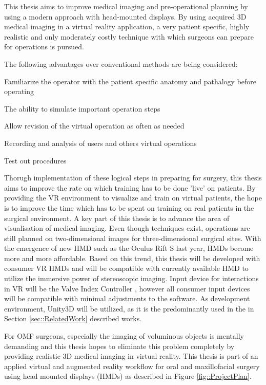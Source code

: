 
This thesis aims to improve medical imaging and pre-operational planning by using a modern approach with head-mounted displays.
By using acquired 3D medical imaging in a virtual reality application, a very patient specific, highly realistic and only moderately costly technique with which surgeons can prepare for operations is pursued.
\newline

The following advantages over conventional methods are being considered:
\begin{compactenum}[label=(\alph*)]
    \item Familiarize the operator with the patient specific anatomy and pathalogy before operating
    \item The ability to simulate important operation steps
    \item Allow revision of the virtual operation as often as needed
    \item Recording and analysis of users and others virtual operations
    \item Test out procedures
\end{compactenum}

Thorugh implementation of these logical steps in preparing for surgery, this thesis aims to improve the rate on which training has to be done 'live' on patients.
By providing the VR environment to visualize and train on virtual patients, the hope is to improve the time which has to be spent on training on real patients in the surgical environment.
\newline
A key part of this thesis is to advance the area of visualisation of medical imaging.
Even though techniques exist, operations are still planned on two-dimensional images for three-dimensional surgical sites.
With the emergence of new HMD such as the Oculus Rift S last year, HMDs become more and more affordable.
Based on this trend, this thesis will be developed with consumer VR HMDs and will be compatible with currently available HMD to utilize the immersive power of stereoscopic imaging.
Input device for interactions in VR will be the Valve Index Controller \cite{ValveIndex}, however all consumer input devices will be compatible with minimal adjustments to the software.
As development environment, Unity3D will be utilized, as it is the predominantly used in the in Section \ref{sec::RelatedWork} described works.

For OMF surgeons, especially the imaging of voluminous objects is mentally demanding and this thesis hopes to eliminate this problem completely by providing realistic 3D medical imaging in virtual reality.
This thesis is part of an applied virtual and augmented reality workflow for oral and maxillofacial surgery using head mounted displays (HMDs) as described in Figure \ref{fig::ProjectPlan}.

